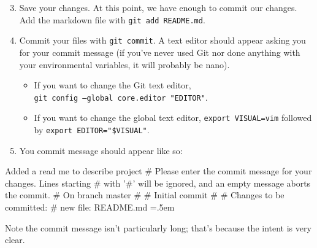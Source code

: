 \documentclass[12pt]{article}
\newenvironment{lcverbatim}
 {\SaveVerbatim{cverb}}
 {\endSaveVerbatim
  \flushleft\fboxrule=0pt\fboxsep=.5em
  \scriptsize
  \colorbox{cverbbg}{%
    \makebox[\dimexpr\linewidth-2\fboxsep][l]{\BUseVerbatim{cverb}}%
  }
  \endflushleft
}
\newcommand{\shellcmd}[1]{\texttt{\colorbox{gray!30}{#1}}}
\begin{document}
\begin{enumerate}
    \setcounter{enumi}{2}
    \item Save your changes. At this point, we have enough to commit our changes. Add the markdown file with \shellcmd{git add README.md}.
    \item Commit your files with \shellcmd{git commit}. A text editor should appear asking you for your commit message (if you've never used Git nor done anything with your environmental variables, it will probably be nano).
    \begin{itemize}
        \item If you want to change the Git text editor, \\ \shellcmd{git config --global core.editor "EDITOR"}.
        \item If you want to change the global text editor, \shellcmd{export VISUAL=vim} followed by \shellcmd{export EDITOR="\$VISUAL"}.
    \end{itemize}

    \item You commit message should appear like so:
\end{enumerate}

\begin{lcverbatim}
Added a read me to describe project
# Please enter the commit message for your changes. Lines starting
# with '#' will be ignored, and an empty message aborts the commit.
# On branch master
#
# Initial commit
#
# Changes to be committed:
#       new file:   README.md
\end{lcverbatim}

\noindent Note the commit message isn't particularly long; that's because the intent is very clear.
\end{document}
